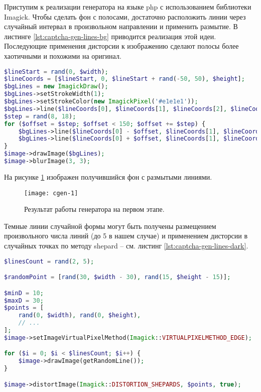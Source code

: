Приступим к реализации генератора на языке php с использованием библиотеки Imagick.
Чтобы сделать фон с полосами, достаточно расположить линии через случайный интервал в произвольном направлении и применить размытие. В листинге \ref{lst:captcha-gen-lines-bg} приводится реализация этой идеи. Последующие применения дисторсии к изображению сделают полосы более хаотичными и похожими на оригинал.

\begin{lstlisting}[language=PHP,basicstyle=\fontsize{11}{11}\selectfont,tabsize=4,breaklines=true,caption={Отрисовка размытых линий для фона.},captionpos=b,label={lst:captcha-gen-lines-bg}]
$lineStart = rand(0, $width);
$lineCoords = [$lineStart, 0, $lineStart + rand(-50, 50), $height];
$bgLines = new ImagickDraw();
$bgLines->setStrokeWidth(1);
$bgLines->setStrokeColor(new ImagickPixel('#e1e1e1'));
$bgLines->line($lineCoords[0], $lineCoords[1], $lineCoords[2], $lineCoords[3]);
$step = rand(8, 18);
for ($offset = $step; $offset < 150; $offset += $step) {
	$bgLines->line($lineCoords[0] - $offset, $lineCoords[1], $lineCoords[2] - $offset, $lineCoords[3]);
	$bgLines->line($lineCoords[0] + $offset, $lineCoords[1], $lineCoords[2] + $offset, $lineCoords[3]);
}
$image->drawImage($bgLines);
$image->blurImage(3, 3);
\end{lstlisting}

На рисунке \ref{fig:cgen-1} изображен получившийся фон с размытыми линиями.
\begin{figure}[h]
	\centering
	\texttt{[image: cgen-1]}
	\caption{Результат работы генератора на первом этапе.}
	\label{fig:cgen-1}
\end{figure}

Темные линии случайной формы могут быть получены размещением произвольного числа линий (до 5 в нашем случае) и применением дисторсии в случайных точках по методу shepard -- см. листинг \ref{lst:captcha-gen-lines-dark}.
\begin{lstlisting}[language=PHP,basicstyle=\fontsize{11}{11}\selectfont,tabsize=4,breaklines=true,caption={Генерирование темных линий и применение дисторсии.},captionpos=b,label={lst:captcha-gen-lines-dark}]
$linesCount = rand(2, 5);

$randomPoint = [rand(30, $width - 30), rand(15, $height - 15)];

$minD = 10;
$maxD = 30;
$points = [
	rand(0, $width), rand(0, $height),
	// ...
];
$image->setImageVirtualPixelMethod(Imagick::VIRTUALPIXELMETHOD_EDGE);

for ($i = 0; $i < $linesCount; $i++) {
	$image->drawImage(getRandomLine());
}

$image->distortImage(Imagick::DISTORTION_SHEPARDS, $points, true);
\end{lstlisting}


